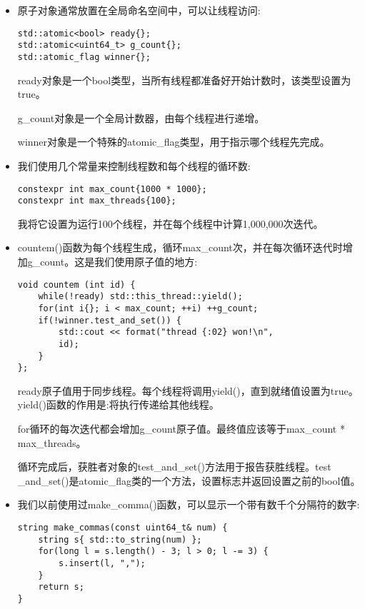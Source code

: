 \begin{itemize}
\item 
原子对象通常放置在全局命名空间中，可以让线程访问:

\begin{lstlisting}[style=styleCXX]
std::atomic<bool> ready{};
std::atomic<uint64_t> g_count{};
std::atomic_flag winner{};
\end{lstlisting}

ready对象是一个bool类型，当所有线程都准备好开始计数时，该类型设置为true。

g\_count对象是一个全局计数器，由每个线程进行递增。

winner对象是一个特殊的atomic\_flag类型，用于指示哪个线程先完成。

\item 
我们使用几个常量来控制线程数和每个线程的循环数:

\begin{lstlisting}[style=styleCXX]
constexpr int max_count{1000 * 1000};
constexpr int max_threads{100};
\end{lstlisting}

我将它设置为运行100个线程，并在每个线程中计算1,000,000次迭代。

\item 
countem()函数为每个线程生成，循环max\_count次，并在每次循环迭代时增加g\_count。这是我们使用原子值的地方:

\begin{lstlisting}[style=styleCXX]
void countem (int id) {
	while(!ready) std::this_thread::yield();
	for(int i{}; i < max_count; ++i) ++g_count;
	if(!winner.test_and_set()) {
		std::cout << format("thread {:02} won!\n",
		id);
	}
};
\end{lstlisting}

ready原子值用于同步线程。每个线程将调用yield()，直到就绪值设置为true。yield()函数的作用是:将执行传递给其他线程。

for循环的每次迭代都会增加g\_count原子值。最终值应该等于max\_count * max\_threads。

循环完成后，获胜者对象的test\_and\_set()方法用于报告获胜线程。test \_and\_set()是atomic\_flag类的一个方法，设置标志并返回设置之前的bool值。

\item 
我们以前使用过make\_comma()函数，可以显示一个带有数千个分隔符的数字:

\begin{lstlisting}[style=styleCXX]
string make_commas(const uint64_t& num) {
	string s{ std::to_string(num) };
	for(long l = s.length() - 3; l > 0; l -= 3) {
		s.insert(l, ",");
	}
	return s;
}
\end{lstlisting}


\end{itemize}
